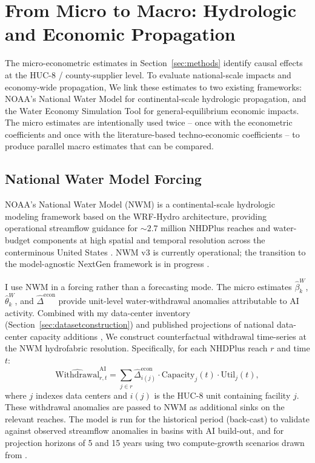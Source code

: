 \documentclass[11pt, letterpaper]{article}
\begin{document}
\section{From Micro to Macro: Hydrologic and Economic Propagation}
\label{sec:macro}

The micro-econometric estimates in Section~\ref{sec:methods} identify causal effects at the HUC-8 / county-supplier level. To evaluate national-scale impacts and economy-wide propagation, We link these estimates to two existing frameworks: NOAA's National Water Model for continental-scale hydrologic propagation, and the Water Economy Simulation Tool for general-equilibrium economic impacts. The micro estimates are intentionally used twice -- once with the econometric coefficients and once with the literature-based techno-economic coefficients -- to produce parallel macro estimates that can be compared.

\subsection{National Water Model Forcing}
\label{sec:nwm}

NOAA's National Water Model (NWM) is a continental-scale hydrologic modeling framework based on the WRF-Hydro architecture, providing operational streamflow guidance for $\sim 2.7$ million NHDPlus reaches and water-budget components at high spatial and temporal resolution across the conterminous United States \citep{cosgrove2024nwm}. NWM v3 is currently operational; the transition to the model-agnostic NextGen framework is in progress \citep{cosgrove2024nwm}.

I use NWM in a forcing rather than a forecasting mode. The micro estimates $\widehat{\beta}_k^{W}$, $\widehat{\theta}_k^{W}$, and $\widehat{\Delta}^{\text{econ}}$ provide unit-level water-withdrawal anomalies attributable to AI activity. Combined with my data-center inventory (Section~\ref{sec:datasetconstruction}) and published projections of national data-center capacity additions \citep{EPRI2024,herrera2025sustainable}, We construct counterfactual withdrawal time-series at the NWM hydrofabric resolution. Specifically, for each NHDPlus reach $r$ and time $t$:
\begin{equation}
\widehat{\text{Withdrawal}}_{r,t}^{\text{AI}} = \sum_{j \in r} \widehat{\Delta}^{\text{econ}}_{i(j)} \cdot \text{Capacity}_j(t) \cdot \text{Util}_j(t),
\label{eq:nwmforcing}
\end{equation}
where $j$ indexes data centers and $i(j)$ is the HUC-8 unit containing facility $j$. These withdrawal anomalies are passed to NWM as additional sinks on the relevant reaches. The model is run for the historical period (back-cast) to validate against observed streamflow anomalies in basins with AI build-out, and for projection horizons of 5 and 15 years using two compute-growth scenarios drawn from \citet{EPRI2024}.
\end{document}
